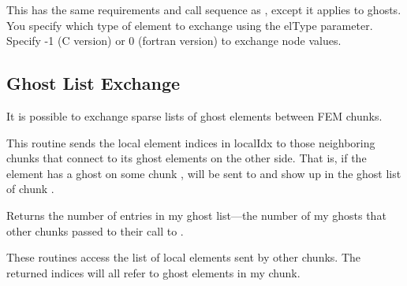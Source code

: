 \documentclass[10pt]{article}
\begin{document}

This has the same requirements and call sequence as , except it applies to ghosts. You specify which type of element to exchange using the elType parameter. Specify -1 (C version) or 0 (fortran version) to exchange node values.  


\subsection{Ghost List Exchange}

It is possible to exchange sparse lists of ghost elements between FEM chunks.


This routine sends the local element indices in localIdx to those neighboring chunks that connect to its ghost elements on the other side.  That is, if the element
 has a ghost on some chunk ,  will be sent to 
and show up in the ghost list of chunk .

Returns the number of entries in my ghost list---the number of my ghosts that
other chunks passed to their call to .


These routines access the list of local elements sent by other chunks.  
The returned indices will all refer to ghost elements in my chunk.



%   
\end{document}
